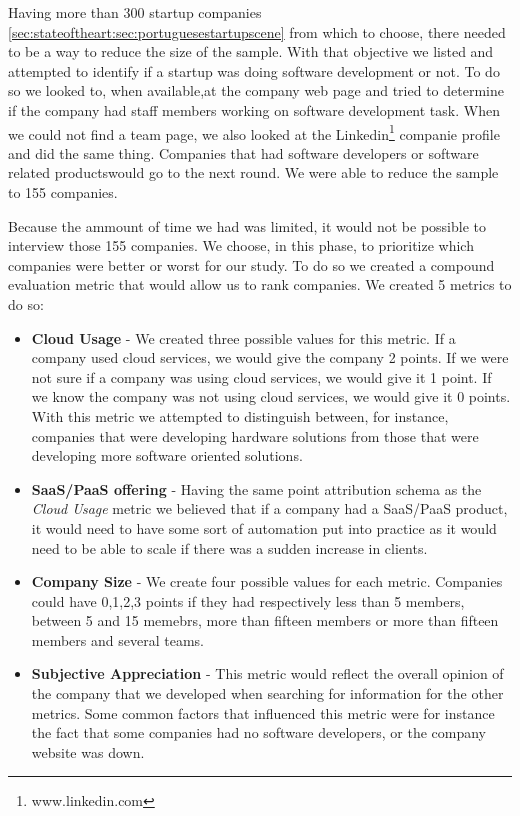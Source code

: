       Having more than 300 startup companies \ref{sec:stateoftheart:sec:portuguesestartupscene} from which to choose, there needed to be a way to reduce the size of the sample. With that objective we listed and attempted to identify if a startup was doing software development or not. To do so we looked to, when available,at the company web page and tried to determine if the company had staff members working on software development task. When we could not find a team page, we also looked at the Linkedin\footnote{www.linkedin.com} companie profile and did the same thing. Companies that had software developers or software related productswould go to the next round. We were able to reduce the sample to 155 companies.

      Because the ammount of time we had was limited, it would not be possible to interview those 155 companies. We choose, in this phase, to prioritize which companies were better or worst for our study. To do so we created a compound evaluation metric that would allow us to rank companies. We created 5 metrics to do so:
      \begin{itemize}
        \item \textbf{Cloud Usage} - We created three possible values for this metric. If a company used cloud services, we would give the company 2 points. If we were not sure if a company was using cloud services, we would give it 1 point. If we know the company was not using cloud services, we would give it 0 points. With this metric we attempted to distinguish between, for instance, companies that were developing hardware solutions from those that were developing more software oriented solutions.

        \item \textbf{SaaS/PaaS offering} - Having the same point attribution schema as the \textit{Cloud Usage} metric we believed that if a company had a SaaS/PaaS product, it would need to have some sort of automation put into practice as it would need to be able to scale if there was a sudden increase in clients.

        \item \textbf{Company Size} - We create four possible values for each metric. Companies could have 0,1,2,3 points if they had respectively less than 5 members, between 5 and 15 memebrs, more than fifteen members or more than fifteen members and several teams.

        \item \textbf{Subjective Appreciation} - This metric would reflect the overall opinion of the company that we developed when searching for information for the other metrics. Some common factors that influenced this metric were for instance the fact that some companies had no software developers, or the company website was down.
      \end{itemize}

